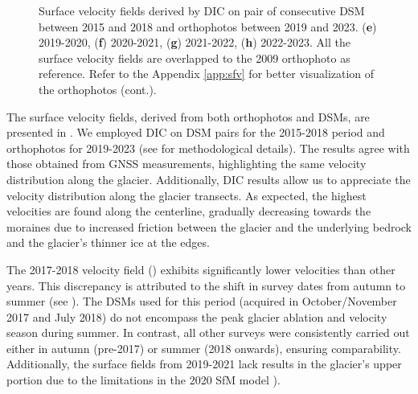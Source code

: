 \begin{figure}[!p]
{    } 
    \caption{Surface velocity fields derived by DIC on pair of consecutive DSM between 2015 and 2018 and 
    orthophotos between 2019 and 2023. (\textbf{e}) 2019-2020, (\textbf{f}) 2020-2021, (\textbf{g}) 2021-2022, (\textbf{h}) 2022-2023.
    All the surface velocity fields are overlapped to the 2009 orthophoto \citep{Degaetani2021} as reference. Refer to the Appendix \ref{app:sfv} for better visualization of the orthophotos (cont.).}
\end{figure}

The surface velocity fields, derived from both orthophotos and DSMs, are presented in . 
We employed DIC on DSM pairs for the 2015-2018 period and orthophotos for 2019-2023 (see  for methodological details). 
The results agree with those obtained from GNSS measurements, highlighting the same velocity distribution along the glacier.
Additionally, DIC results allow us to appreciate the velocity distribution along the glacier transects. 
As expected, the highest velocities are found along the centerline, gradually decreasing towards the moraines due to increased friction between the glacier and the underlying bedrock and the glacier's thinner ice at the edges.

The 2017-2018 velocity field () exhibits significantly lower velocities than other years. 
This discrepancy is attributed to the shift in survey dates from autumn to summer (see ). 
The DSMs used for this period (acquired in October/November 2017 and July 2018) do not encompass the peak glacier ablation and velocity season during summer. 
In contrast, all other surveys were consistently carried out either in autumn (pre-2017) or summer (2018 onwards), ensuring comparability.  
Additionally, the surface fields from 2019-2021 lack results in the glacier's upper portion due to the limitations in the 2020 SfM model ).

